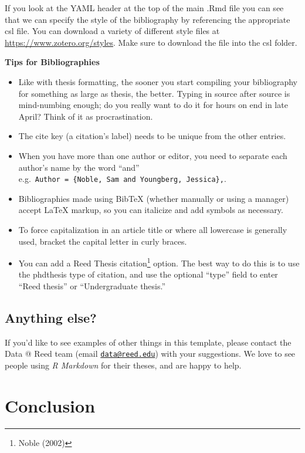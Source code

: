 \documentclass[12pt,twoside]{reedthesis}
\providecommand{\tightlist}{%
  \setlength{\itemsep}{0pt}\setlength{\parskip}{0pt}}
\begin{document}
If you look at the YAML header at the top of the main .Rmd file you can see that we can specify the style of the bibliography by referencing the appropriate csl file. You can download a variety of different style files at \url{https://www.zotero.org/styles}. Make sure to download the file into the csl folder.

\vfill

\textbf{Tips for Bibliographies}
\begin{itemize}
\tightlist
\item
  Like with thesis formatting, the sooner you start compiling your bibliography for something as large as thesis, the better. Typing in source after source is mind-numbing enough; do you really want to do it for hours on end in late April? Think of it as procrastination.
\item
  The cite key (a citation's label) needs to be unique from the other entries.
\item
  When you have more than one author or editor, you need to separate each author's name by the word ``and'' e.g.~\texttt{Author\ =\ \{Noble,\ Sam\ and\ Youngberg,\ Jessica\},}.
\item
  Bibliographies made using BibTeX (whether manually or using a manager) accept LaTeX markup, so you can italicize and add symbols as necessary.
\item
  To force capitalization in an article title or where all lowercase is generally used, bracket the capital letter in curly braces.
\item
  You can add a Reed Thesis citation\footnote{Noble (2002)} option. The best way to do this is to use the phdthesis type of citation, and use the optional ``type'' field to enter ``Reed thesis'' or ``Undergraduate thesis.''
\end{itemize}
\hypertarget{anything-else}{%
\section{Anything else?}\label{anything-else}}

If you'd like to see examples of other things in this template, please contact the Data @ Reed team (email \href{mailto:data@reed.edu}{\nolinkurl{data@reed.edu}}) with your suggestions. We love to see people using \emph{R Markdown} for their theses, and are happy to help.

\hypertarget{conclusion}{%
\chapter*{Conclusion}\label{conclusion}}
\end{document}
